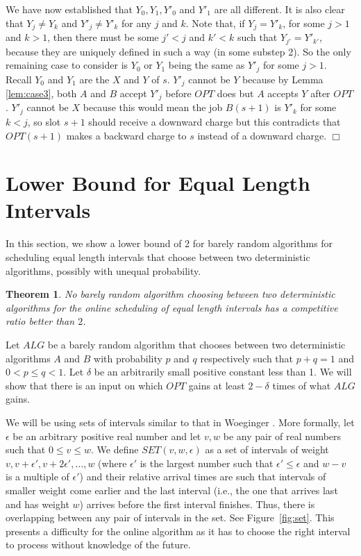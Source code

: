 \documentclass[11pt]{article}
\newtheorem{theorem}{Theorem}[section]
\newcommand{\qed}{\hspace*{\fill}$\Box$\par\medskip}
\newenvironment{proof}{\noindent{\it Proof. }\ignorespaces}{\qed}
\begin{document}
\begin{proof}
We have now established that $Y_0, Y_1, Y'_0$ and $Y'_1$ are all different.
It is also clear that $Y_j \neq Y_k$ and $Y'_j \neq Y'_k$ for any $j$ and $k$.
Note that, if $Y_j = Y'_k$, for some $j>1$ and $k>1$, 
then there must be some $j'<j$ and $k'<k$ such that $Y_{j'} = Y'_{k'}$,
because they are uniquely defined in such a way (in some substep 2). 
So the only remaining case to consider is $Y_0$ or $Y_1$ being the same 
as $Y'_j$ for some $j>1$. 
Recall $Y_0$ and $Y_1$ are the $X$ and $Y$ of $s$. 
$Y'_j$ cannot be $Y$
because by Lemma \ref{lem:case3},
both $A$ and $B$ accept $Y'_j$ before $OPT$ does
but $A$ accepts $Y$ after $OPT$. 
$Y'_j$ cannot be $X$ because this would mean the job $B(s+1)$ is $Y'_k$ for 
some $k<j$, so slot $s+1$ should receive a downward charge 
but this contradicts that $OPT(s+1)$ makes a backward charge to $s$ 
instead of a downward charge. 
\end{proof}

\section{Lower Bound for Equal Length Intervals}
  \label{sec:LB}

In this section, we show a lower bound of 2 for barely
random algorithms for scheduling equal length intervals
that choose between two deterministic algorithms,
possibly with unequal probability.

\begin{theorem}
No barely random algorithm choosing between two deterministic algorithms
for the online scheduling of equal length intervals
has a competitive ratio better than $2$.
\end{theorem}

Let $ALG$ be a barely random algorithm that chooses between 
two deterministic algorithms $A$ and $B$ with 
probability $p$ and $q$ respectively
such that $p+q=1$ and $0 < p \leq q < 1$.
Let $\delta$ be an arbitrarily small positive constant
less than 1.
We will show that there is an input on which $OPT$
gains at least $2-\delta$ times of what $ALG$ gains.

We will be using sets of intervals similar to
that in Woeginger \cite{Woeg94}.
More formally, let $\epsilon$ be an arbitrary positive real number
and let $v, w$ be any pair of real numbers such that
$0 \leq v \leq w$. 
We define $SET(v,w,\epsilon)$ as a set of intervals of weight 
$v, v+\epsilon', v+2\epsilon' , \dots, w$ 
(where $\epsilon'$ is the largest number 
such that $\epsilon' \leq \epsilon$ and 
$w-v$ is a multiple of $\epsilon'$)
and their relative arrival times are such that
intervals of smaller weight come earlier
and the last interval
(i.e., the one that arrives last and has weight $w$)
arrives before the first interval finishes.
Thus, there is overlapping between any pair of
intervals in the set.
See Figure~\ref{fig:set}.
This presents a difficulty for the online algorithm
as it has to choose the right interval to process
without knowledge of the future.
\end{document}
